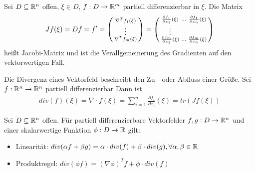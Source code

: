 \begin{definition}
	Sei $D \subseteq \mathbb{R}^n$ offen, $\xi \in D$, $f : D \rightarrow \mathbb{R}^m$ partiell differenzierbar in $\xi$. Die Matrix
	\begin{align*}
		Jf(\xi) = Df = f'= \left(\begin{smallmatrix}
			\nabla^T f_1(\xi) \\
			\vdots \\
			\nabla^T f_m(\xi) \\	
		\end{smallmatrix}\right) = 
		\left(\begin{smallmatrix}
			\frac{\partial f_1}{\partial x_1}(\xi) & \hdots & \frac{\partial f_1}{\partial x_n}(\xi)
			 \\
			 \vdots & & 
			 \\
			\frac{\partial f_m}{\partial x_1}(\xi) & \hdots & \frac{\partial f_m}{\partial x_n}(\xi)	
		\end{smallmatrix}\right) 
	\end{align*}
	heißt Jacobi-Matrix und ist die Verallgemeinerung des Gradienten auf den vektorwertigen Fall.
\end{definition}

\begin{definition}[Divergenz]
	Die Divergenz eines Vektorfeld beschreibt den Zu - oder Abfluss einer Größe. Sei $f : \mathbb{R}^n \rightarrow \mathbb{R}^n$ partiell differenzierbar Dann ist
	\begin{align*}
	div(f)(\xi) = \nabla \cdot f(\xi) = \sum_{i = 1}^{n} \frac{\partial f_i}{\partial x_i}(\xi) = tr(Jf(\xi))
	\end{align*}
\end{definition}

\begin{satz}
	Sei $D \subseteq \mathbb{R}^n$ offen. Für partiell differenzierbare Vektorfelder $f,g : D \rightarrow \mathbb{R}^n$ und einer skalarwertige Funktion $\phi : D \rightarrow \mathbb{R}$ gilt:
	\begin{itemize}[noitemsep]
		\item Linearität: $div(\alpha f + \beta g) = \alpha \cdot div (f) + \beta \cdot div (g), \forall \alpha, \beta \in \mathbb{R}$
		\item  Produktregel: $div(\phi f) = (\nabla \phi)^T f + \phi \cdot div (f)$
	\end{itemize}
\end{satz}


